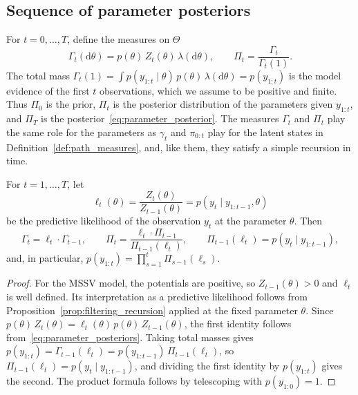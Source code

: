 \subsection{Sequence of parameter posteriors}
\label{sec:parameter_posteriors}
For $t=0,\ldots,T$, define the measures on $\Theta$
\begin{equation}
    \Gamma_t(\mathrm{d}\theta) = p(\theta)\,Z_t(\theta)\,\lambda(\mathrm{d}\theta), \qquad \Pi_t = \frac{\Gamma_t}{\Gamma_t(1)}.
    \label{eq:parameter_posteriors}
\end{equation}
The total mass $\Gamma_t(1) = \int p(y_{1:t}\mid\theta)\,p(\theta)\,\lambda(\mathrm{d}\theta) = p(y_{1:t})$ is the model evidence of the first $t$ observations, which we assume to be positive and finite. Thus $\Pi_0$ is the prior, $\Pi_t$ is the posterior distribution of the parameters given $y_{1:t}$, and $\Pi_T$ is the posterior~\eqref{eq:parameter_posterior}. The measures $\Gamma_t$ and $\Pi_t$ play the same role for the parameters as $\gamma_t$ and $\pi_{0:t}$ play for the latent states in Definition~\ref{def:path_measures}, and, like them, they satisfy a simple recursion in time.

\begin{proposition}
    \label{prop:parameter_posterior_recursion}
    For $t=1,\ldots,T$, let
    \begin{equation}
        \ell_t(\theta) = \frac{Z_t(\theta)}{Z_{t-1}(\theta)} = p(y_t\mid y_{1:t-1},\theta)
    \end{equation}
    be the predictive likelihood of the observation $y_t$ at the parameter $\theta$. Then
    \begin{equation}
        \Gamma_t = \ell_t\cdot\Gamma_{t-1}, \qquad
        \Pi_t = \frac{\ell_t\cdot\Pi_{t-1}}{\Pi_{t-1}(\ell_t)}, \qquad
        \Pi_{t-1}(\ell_t) = p(y_t\mid y_{1:t-1}),
        \label{eq:parameter_posterior_recursion}
    \end{equation}
    and, in particular, $p(y_{1:t}) = \prod_{s=1}^{t}\Pi_{s-1}(\ell_s)$.
\end{proposition}
\begin{proof}
    For the MSSV model, the potentials are positive, so $Z_{t-1}(\theta)>0$ and $\ell_t$ is well defined. Its interpretation as a predictive likelihood follows from Proposition~\ref{prop:filtering_recursion} applied at the fixed parameter $\theta$. Since $p(\theta)\,Z_t(\theta) = \ell_t(\theta)\,p(\theta)\,Z_{t-1}(\theta)$, the first identity follows from~\eqref{eq:parameter_posteriors}. Taking total masses gives $p(y_{1:t}) = \Gamma_{t-1}(\ell_t) = p(y_{1:t-1})\,\Pi_{t-1}(\ell_t)$, so $\Pi_{t-1}(\ell_t) = p(y_t\mid y_{1:t-1})$, and dividing the first identity by $p(y_{1:t})$ gives the second. The product formula follows by telescoping with $p(y_{1:0}) = 1$.
\end{proof}

